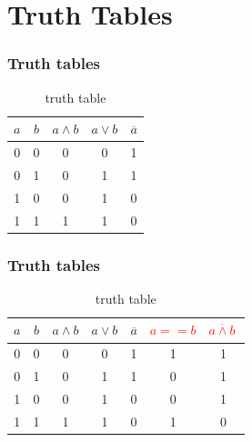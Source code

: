 \documentclass{beamer}
\begin{document}
\section{Truth Tables}
\begin{frame}\frametitle{Truth tables}
  \begin{table}[H]
  \centering
  \begin{tabular}{c|c||c|c|c}
  \textbf{$a$} & \textbf{$b$} & \textbf{$a\land b$} & \textbf{$a\lor b$} & \textbf{$\overline{a}$} \\ \hline
  0          & 0          & 0            & 0            & 1           \\
  0          & 1          & 0            & 1            & 1           \\
  1          & 0          & 0            & 1            & 0           \\
  1          & 1          & 1            & 1            & 0          
  \end{tabular}
  \caption{truth table}
  \label{tab:truth2}
  \end{table}
\end{frame}

\begin{frame}\frametitle{Truth tables}
   \begin{table}[H]
  \centering
  \begin{tabular}{c|c||c|c|c|c|c}
  \textbf{$a$} & \textbf{$b$} & \textbf{$a\land b$} & \textbf{$a\lor b$} & \textbf{$\overline{a}$} & \textbf{ \textcolor{red}{$a==b$}}  & \textbf{ \textcolor{red}{$\overline{a\land  b}\ $}} \\ \hline
  0          & 0          & 0            & 0            & 1          & 1        & 1      \\
  0          & 1          & 0            & 1            & 1          & 0        & 1  \\
  1          & 0          & 0            & 1            & 0          & 0        & 1   \\
  1          & 1          & 1            & 1            & 0          & 1        & 0  
  \end{tabular}
  \caption{truth table}
  \label{tab:truth}
  \end{table}
\end{frame}
\end{document}
